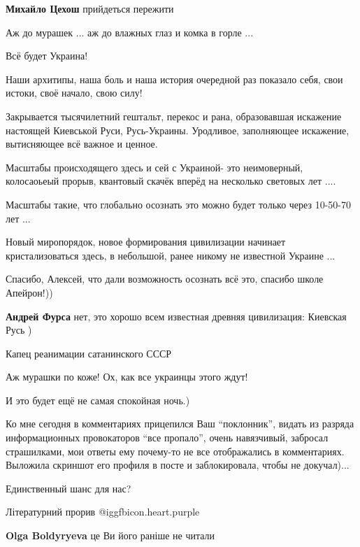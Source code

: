 \begin{itemize}
\begin{itemize}
\textbf{Михайло Цехош} прийдеться пережити
\end{itemize} %


Аж до мурашек ... аж до влажных глаз и комка в горле ...

Всё будет Украина!

Наши архитипы, наша боль и наша история очередной раз показало себя, свои
истоки, своё начало, свою силу!

Закрывается тысячилетний гештальт, перекос и рана, образовавшая искажение
настоящей Киевськой Руси, Русь-Украины. Уродливое, заполняющее искажение,
вытисняющее всё важное и ценное.

Масштабы происходящего здесь и сей с Украиной- это неимоверный, колосаоьеый
прорыв, квантовый скачёк вперёд на несколько световых лет ....

Масштабы такие, что глобально осознать это можно будет только через 10-50-70
лет ...

Новый миропорядок, новое формирования цивилизации начинает кристализоваться
здесь, в небольшой, ранее никому не известной Украине ...

Спасибо, Алексей, что дали возможность осознать всё это, спасибо школе
Апейрон!))

\textbf{Андрей Фурса} нет, это хорошо всем известная древняя цивилизация: Киевская Русь )

Капец реанимации сатанинского СССР

Аж мурашки по коже!
Ох, как все украинцы этого ждут!

И это будет ещё не самая спокойная ночь.)


Ко мне сегодня в комментариях прицепился Ваш \enquote{поклонник}, видать из разряда
информационных провокаторов \enquote{все пропало}, очень навязчивый, забросал
страшилками, мои ответы ему почему-то не все отображались в комментариях.
Выложила скриншот его профиля в посте и заблокировала, чтобы не докучал)...

Единственный шанс для нас?

Літературний прорив @igg{fbicon.heart.purple} 

\begin{itemize} %
\textbf{Olga Boldyryeva} це Ви його раніше не читали


\end{itemize}
\end{itemize}

